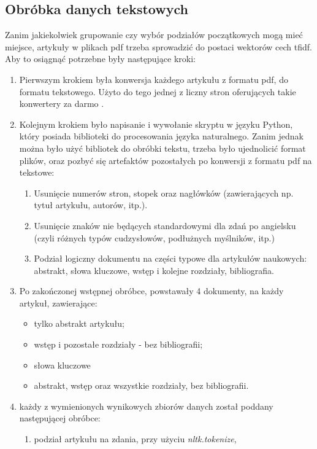 \documentclass{article}
\begin{document}
\subsection{Obróbka danych tekstowych}

Zanim jakiekolwiek grupowanie czy wybór podziałów początkowych mogą mieć miejsce, artykuły w plikach pdf trzeba sprowadzić do postaci wektorów cech tfidf. 
Aby to osiągnąć potrzebne były następujące kroki:

\begin{enumerate}
	\item Pierwszym krokiem była konwersja każdego artykułu z formatu pdf, do formatu tekstowego. Użyto do tego jednej z liczny stron oferujących takie konwertery za darmo .
	\item Kolejnym krokiem było napisanie i wywołanie skryptu w języku Python, który posiada biblioteki do procesowania języka naturalnego. Zanim jednak można było użyć bibliotek do obróbki tekstu, trzeba było ujednolicić format plików, oraz pozbyć się artefaktów pozostałych po konwersji z formatu pdf na tekstowe:
	\begin{enumerate}
		\item Usunięcie numerów stron, stopek oraz nagłówków (zawierających np. tytuł artykułu, autorów, itp.).
		\item Usunięcie znaków nie będących standardowymi dla zdań po angielsku (czyli różnych typów cudzysłowów, podłużnych myślników, itp.)
		\item Podział logiczny dokumentu na części typowe dla artykułów naukowych: abstrakt, słowa kluczowe, wstęp i kolejne rozdziały, bibliografia.
	\end{enumerate}
	\item Po zakończonej wstępnej obróbce, powstawały 4 dokumenty, na każdy artykuł, zawierające:
	\begin{itemize} \label{doc_types}
		\item tylko abstrakt artykułu;
		\item wstęp i pozostałe rozdziały - bez bibliografii;
		\item słowa kluczowe
		\item abstrakt, wstęp oraz wszystkie rozdziały, bez bibliografii.
	\end{itemize}
	\item każdy z wymienionych wynikowych zbiorów danych został poddany następującej obróbce: 
	\begin{enumerate}
		\item podział artykułu na zdania, przy użyciu \textit{nltk.tokenize},

\end{enumerate}
\end{enumerate}
\end{document}
